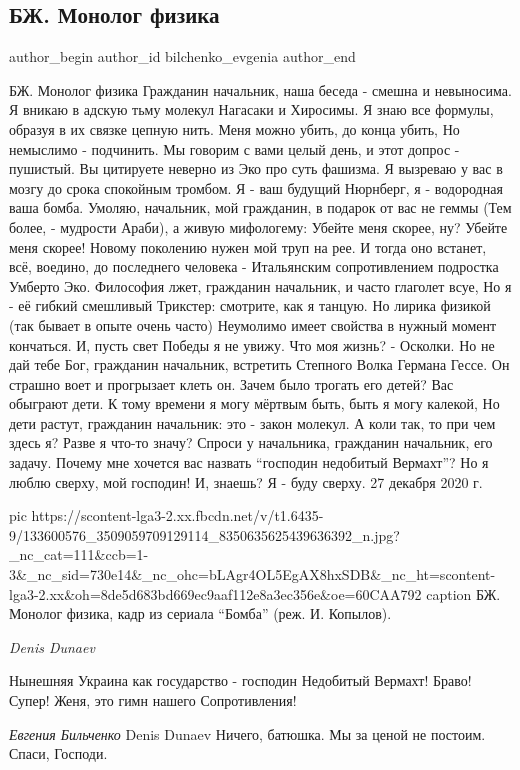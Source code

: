  
 
 
 
 
 
\subsection{БЖ. Монолог физика}
\label{sec:27_12_2020.fb.bilchenko_evgenia.5.monolog_fizika}
\ifcmt
 author_begin
   author_id bilchenko_evgenia
 author_end
\fi

БЖ. Монолог физика
Гражданин начальник, наша беседа - смешна и невыносима. 
Я вникаю в адскую тьму молекул Нагасаки и Хиросимы. 
Я знаю все формулы, образуя в их связке цепную нить.
Меня можно убить, до конца убить, 
Но немыслимо - подчинить.
Мы говорим с вами целый день, и этот допрос - пушистый. 
Вы цитируете неверно из Эко про суть фашизма.
Я вызреваю у вас в мозгу до срока спокойным тромбом.
Я - ваш будущий Нюрнберг, я - водородная ваша бомба.
Умоляю, начальник, мой гражданин, в подарок от вас не геммы
(Тем более, - мудрости Араби), а живую мифологему:
Убейте меня скорее, ну? Убейте меня скорее!
Новому поколению нужен мой труп на рее. 
И тогда оно встанет, всё, воедино, до последнего человека -
Итальянским сопротивлением подростка Умберто Эко. 
Философия лжет, гражданин начальник, и часто глаголет всуе,
Но я - её гибкий смешливый Трикстер: смотрите, как я танцую.
Но лирика физикой (так бывает в опыте очень часто)
Неумолимо имеет свойства в нужный момент кончаться. 
И, пусть свет Победы я не увижу. Что моя жизнь? - Осколки.
Но не дай тебе Бог, гражданин начальник, встретить 
Степного Волка
Германа Гессе. Он страшно воет и прогрызает клеть он.
Зачем было трогать его детей? Вас обыграют дети.
К тому времени я могу мёртвым быть, быть я могу калекой,
Но дети растут, гражданин начальник: это - закон молекул. 
А коли так, то при чем здесь я? Разве я что-то значу?
Спроси у начальника, гражданин начальник, его задачу.
Почему мне хочется вас назвать \enquote{господин недобитый Вермахт}?
Но я люблю сверху, мой господин! И, знаешь? Я - буду сверху.
27 декабря 2020 г. 

\ifcmt
  pic https://scontent-lga3-2.xx.fbcdn.net/v/t1.6435-9/133600576_3509059709129114_8350635625439636392_n.jpg?_nc_cat=111&ccb=1-3&_nc_sid=730e14&_nc_ohc=bLAgr4OL5EgAX8hxSDB&_nc_ht=scontent-lga3-2.xx&oh=8de5d683bd669ec9aaf112e8a3ec356e&oe=60CAA792
  caption БЖ. Монолог физика, кадр из сериала \enquote{Бомба} (реж. И. Копылов).
\fi

\emph{Denis Dunaev}

Нынешняя Украина как государство - господин Недобитый Вермахт! Браво! Супер!
Женя, это гимн нашего Сопротивления!

\emph{Евгения Бильченко}
Denis Dunaev Ничего, батюшка. Мы за ценой не постоим. Спаси, Господи.
